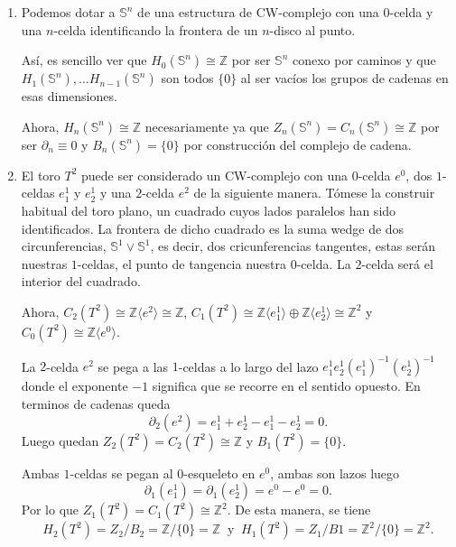 \begin{example}
    \hfill
    \begin{enumerate}[label=(\roman*)]
        \item Podemos dotar a $\mathbb{S}^n$ de una estructura de CW-complejo con una $0$-celda y una $n$-celda identificando la frontera de un $n$-disco al punto.
        
        Así, es sencillo ver que $H_0(\mathbb{S}^n)\cong \mathbb{Z}$ por ser $\mathbb{S}^n$ conexo por caminos y que $H_1(\mathbb{S}^n), \dots H_{n-1}(\mathbb{S}^n)$ son todos $\{0\}$ al ser vacíos los grupos de cadenas en esas dimensiones.

        Ahora, $H_{n}(\mathbb{S}^n)\cong \mathbb{Z}$ necesariamente ya que $Z_n(\mathbb{S}^n)=C_n(\mathbb{S}^n)\cong \mathbb{Z}$ por ser $\partial_n \equiv 0$ y $B_n(\mathbb{S}^n)=\{0\}$ por construcción del complejo de cadena.
        \item El toro $T^2$ puede ser considerado un CW-complejo con una $0$-celda $e^0$, dos $1$-celdas $e^1_1$ y $e^1_2$ y una $2$-celda $e^2$ de la siguiente manera. Tómese la construir habitual del toro plano, un cuadrado cuyos lados paralelos han sido identificados. La frontera de dicho cuadrado es la suma wedge de dos circunferencias, $\mathbb{S}^1\vee \mathbb{S}^1$, es decir, dos cricunferencias tangentes, estas serán nuestras $1$-celdas, el punto de tangencia nuestra $0$-celda. La $2$-celda será el interior del cuadrado.
        
        Ahora, $C_2(T^2)\cong \mathbb{Z}\langle e^2 \rangle \cong \mathbb{Z}$, $C_1(T^2)\cong \mathbb{Z}\langle e^1_1 \rangle \oplus \mathbb{Z}\langle e^1_2 \rangle \cong \mathbb{Z}^2$ y $C_0(T^2)\cong \mathbb{Z}\langle e^0 \rangle$.

        La $2$-celda $e^2$ se pega a las $1$-celdas a lo largo del lazo $e^1_1 e^1_2 (e^1_1)^{-1} (e^1_2)^{-1} $ donde el exponente $-1$ significa que se recorre en el sentido opuesto. En terminos de cadenas queda
        \begin{equation*}
            \partial_2(e^2) = e^1_1 + e^1_2 - e^1_1 - e^1_2 = 0.
        \end{equation*}
        Luego quedan $Z_2(T^2)=C_2(T^2)\cong \mathbb{Z}$ y $B_1(T^2)=\{0\}$. 

        Ambas $1$-celdas se pegan al $0$-esqueleto en $e^0$, ambas son lazos luego 
        \begin{equation*}
            \partial_1(e^1_1) = \partial_1(e^1_2) = e^0 - e^0 = 0.
        \end{equation*}
        Por lo que $Z_1(T^2)=C_1(T^2)\cong \mathbb{Z}^2$. De esta manera, se tiene 
        \begin{equation*}
            H_2(T^2)=Z_2/B_2 = \mathbb{Z}/\{0\} = \mathbb{Z} ~\text{ y }~ H_1(T^2)=Z_1/B1= \mathbb{Z}^2/\{0\} = \mathbb{Z}^2.
        \end{equation*}


\end{enumerate}
\end{example}
